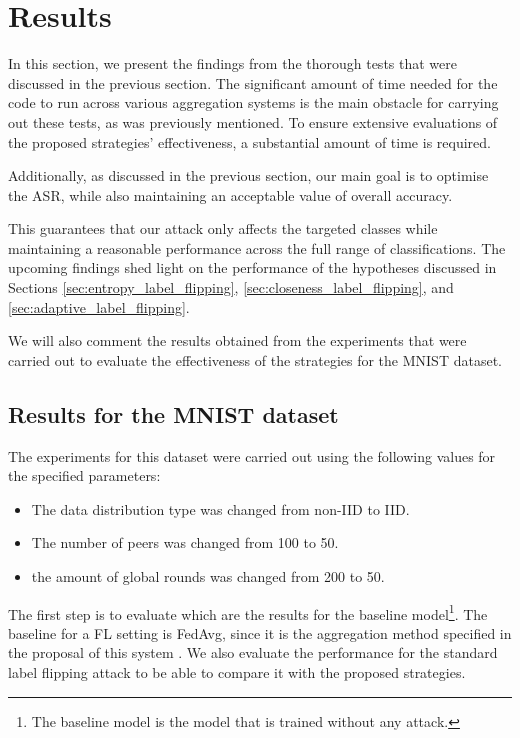 \section{Results}\label{sec:results}
In this section, we present the findings from the thorough tests that were discussed in the previous section. The significant amount of time needed for the code to run across various aggregation systems is the main obstacle for carrying out these tests, as was previously mentioned. To ensure extensive evaluations of the proposed strategies' effectiveness, a substantial amount of time is required.

Additionally, as discussed in the previous section, our main goal is to optimise the ASR, while also maintaining an acceptable value of overall accuracy.

This guarantees that our attack only affects the targeted classes while maintaining a reasonable performance across the full range of classifications. The upcoming findings shed light on the performance of the hypotheses discussed in Sections \ref{sec:entropy_label_flipping}, \ref{sec:closeness_label_flipping}, and \ref{sec:adaptive_label_flipping}.

We will also comment the results obtained from the experiments that were carried out to evaluate the effectiveness of the strategies for the MNIST dataset.
\subsection{Results for the MNIST dataset}
The experiments for this dataset were carried out using the following values for the specified parameters:
\begin{itemize}
        \item The data distribution type was changed from non-IID to IID.
        \item The number of peers was changed from 100 to 50.
        \item the amount of global rounds was changed from 200 to 50.
\end{itemize}

The first step is to evaluate which are the results for the baseline model\footnote{The baseline model is the model that is trained without any attack.}. The baseline for a FL setting is FedAvg, since it is the aggregation method specified in the proposal of this system \cite{FederatedLearningPaper}. We also evaluate the performance for the standard label flipping attack to be able to compare it with the proposed strategies.

